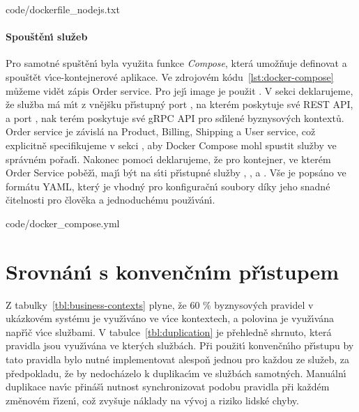 
{code/dockerfile_nodejs.txt}

\paragraph{Spouštěn\'{\i} služeb}
Pro samotné spuštěn\'{\i} byla využita funkce \textit{Compose}, která umožňuje
definovat a spouštět v\'{\i}ce-kontejnerové aplikace. Ve zdrojovém kódu~\ref{lst:docker-compose}
můžeme vidět zápis Order service. Pro jej\'{\i} image je použit .
V sekci  deklarujeme, že služba má m\'{\i}t z vnějšku př\'{\i}stupn\'y port , na kterém poskytuje své
\gls{REST} \gls{API}, a port , nak terém poskytuje své gRPC \gls{API} pro sd\'{\i}lené byznysov\'ych kontextů. Order service je závislá
na Product, Billing, Shipping a User service, což explicitně specifikujeme v sekci ,
aby Docker Compose mohl spustit služby ve správném pořad\'{\i}. Nakonec pomoc\'{\i}  deklarujeme,
že pro kontejner, ve kterém Order Service poběž\'{\i}, maj\'{\i} b\'yt na s\'{\i}ti př\'{\i}stupné služby , ,
 a . Vše je popsáno ve formátu \gls{YAML}, kter\'y je vhodný
pro konfiguračn\'{\i} soubory díky jeho snadné čitelnosti pro člověka a jednoduchému použ\'{\i}ván\'{\i}.


{code/docker_compose.yml}

\section{Srovnán\'{\i} s konvenčn\'{\i}m př\'{\i}stupem}

Z tabulky~\ref{tbl:business-contexts} plyne, že 60 \% byznysov\'ych pravidel v ukázkovém systému je
využ\'{\i}váno ve v\'{\i}ce kontextech, a polovina je využ\'{\i}vána např\'{\i}č v\'{\i}ce službami.
V tabulce~\ref{tbl:duplication} je přehledně shrnuto, která pravidla jsou využ\'{\i}vána ve kter\'ych službách.
Při použit\'{\i} konvenčn\'{\i}ho př\'{\i}stupu by tato pravidla bylo nutné implementovat alespoň
jednou pro každou ze služeb, za předpokladu, že by nedocházelo k duplikac\'{\i}m ve službách samotn\'ych.
Manuáln\'{\i} duplikace nav\'{\i}c přináš\'{\i} nutnost synchronizovat podobu pravidla při každém změnovém
ř\'{\i}zen\'{\i}, což zvyšuje náklady na v\'yvoj a riziko lidské chyby.

